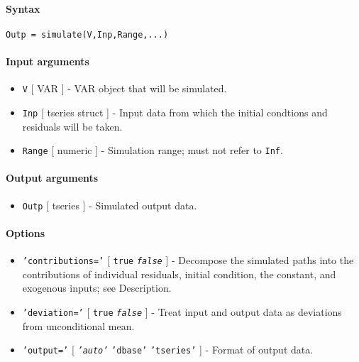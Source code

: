 


	\paragraph{Syntax}

\begin{verbatim}
Outp = simulate(V,Inp,Range,...)
\end{verbatim}

\paragraph{Input arguments}

\begin{itemize}
\item
  \texttt{V} {[} VAR {]} - VAR object that will be simulated.
\item
  \texttt{Inp} {[} tseries \textbar{} struct {]} - Input data from which
  the initial condtions and residuals will be taken.
\item
  \texttt{Range} {[} numeric {]} - Simulation range; must not refer to
  \texttt{Inf}.
\end{itemize}

\paragraph{Output arguments}

\begin{itemize}
\itemsep1pt\parskip0pt
\item
  \texttt{Outp} {[} tseries {]} - Simulated output data.
\end{itemize}

\paragraph{Options}

\begin{itemize}
\item
  \texttt{'contributions='} {[} \texttt{true} \textbar{}
  \emph{\texttt{false}} {]} - Decompose the simulated paths into the
  contributions of individual residuals, initial condition, the
  constant, and exogenous inputs; see Description.
\item
  \texttt{'deviation='} {[} \texttt{true} \textbar{}
  \emph{\texttt{false}} {]} - Treat input and output data as deviations
  from unconditional mean.
\item
  \texttt{'output='} {[} \emph{\texttt{'auto'}} \textbar{}
  \texttt{'dbase'} \textbar{} \texttt{'tseries'} {]} - Format of output
  data.
\end{itemize}

